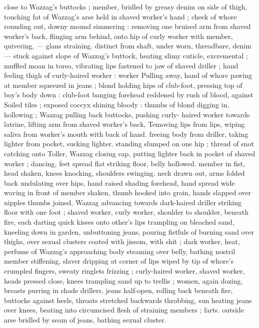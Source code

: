 close to Wazzag's buttocks ; member, bridled by greasy denim on 
side of thigh, touching fat of Wazzag's arse held in shaved worker's 
hand ; cheek of whore rounding out, downy mound simmering : 
removing one bruised arm from shaved worker's back, flinging arm 
behind, onto hip of curly worker with member, quivering, --- glans 
straining. distinct from shaft, under worn, threadbare, denim --- 
stuck against slope of Wazzag's buttock, heating slimy cuticle, 
excremental ; muffled moan in torso, vibrating lips fastened to jaw of 
shaved driller ; hand feeling thigh of curly-haired worker : worker 
Pulling away, hand of whore pawing at member squeezed in jeans ; 
blond holding hips of club-foot, pressing top of boy's body down : 
club-foot banging forehead reddened by rush of blood, against 
Soiled tiles ; exposed coccyx shining bloody : thumbs of blond 
digging in, hollowing ; Wazzag pulling back buttocks, pushing curly- 
haired worker towards latrine, lifting arm from shaved worker's back, 
Temoving lips from lips, wiping saliva from worker's mouth with back 
of hand. freeing body from driller, taking lighter from pocket, sucking 
lighter. standing slumped on one hip ; thread of snot catching onto 
Toller, Wazzag closing cap, putting lighter back in pocket of shaved 
worker ; dancing, feet spread flat striking floor, belly hollowed. 
member in fist, head shaken, knees knocking, shoulders swinging. 
neck drawn out, arms folded back undulating over hips, hand raised 
shading forehead, hand spread wide waving in front of member 
shaken, thumb hooked into groin, hands slapped over nipples 
thumbs joined, Wazzag advancing towards dark-haired driller striking 
floor with one foot ; shaved worker, curly worker, shoulder to 
shoulder, beneath fire, each darting quick kisses onto other's lips 
trampling on bleached sand, kneeling down in garden, unbuttoning 
jeans, pouring fistfuls of burning sand over thighs, over sexual 
clusters coated with jissom, with shit ; dark worker, heat, perfume of 
Wazzag's approaching body steaming over belly, bathing nostril 
member stiffening, slaver dripping at corner of lips wiped by tip of 
whore's crumpled fingers, sweaty ringlets frizzing ; curly-haired 
worker, shaved worker, heads pressed close, knees trampling sand 
up to trellis ; women, again dozing, breasts purring in shade 
drillers, jeans half-open, rolling back beneath fire, buttocks against 
heels, throats stretched backwards throbbing, sun heating jeans over 
knees, beating into circumcised flesh of straining members ; farts. 
outside arse bridled by seam of jeans, bathing sexual cluster. 
